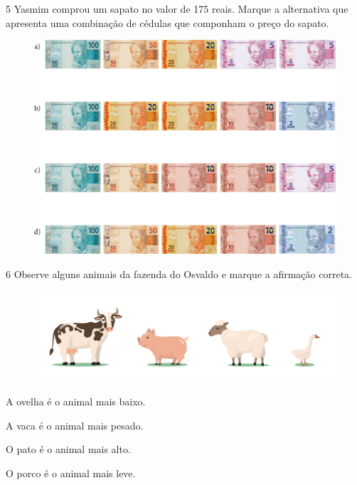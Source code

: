 \pagebreak
\num{5} Yasmim comprou um sapato no valor de 175 reais. Marque a alternativa que apresenta uma combinação de cédulas que componham o preço do sapato.

\begin{figure}[htpb!]
\centering
\includegraphics[width=.7\textwidth]{./media/image115.png}
\end{figure}

\num{6} Observe alguns animais da fazenda do Osvaldo e marque a afirmação correta.

\begin{figure}[htpb!]
\includegraphics[width=\textwidth]{./media/image116.png}
\end{figure}


\begin{escolha}
\item A ovelha é o animal mais baixo.

\item A vaca é o animal mais pesado.

\item O pato é o animal mais alto.

\item O porco é o animal mais leve.
\end{escolha}

